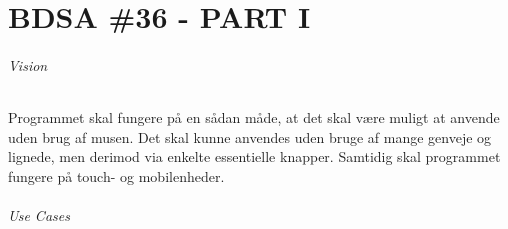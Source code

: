 \documentclass{article}
\begin{document}
  
  \part*{BDSA \#36 - PART I}
  
  \paragraph{Vision} \mbox{} 
  
  Programmet skal fungere på en sådan måde, at det skal være muligt at anvende uden brug af musen. Det skal kunne anvendes uden bruge af mange genveje og lignede, men derimod via enkelte essentielle knapper. 
Samtidig skal programmet fungere på touch- og mobilenheder.
  
   \paragraph{Use Cases}
\end{document}

